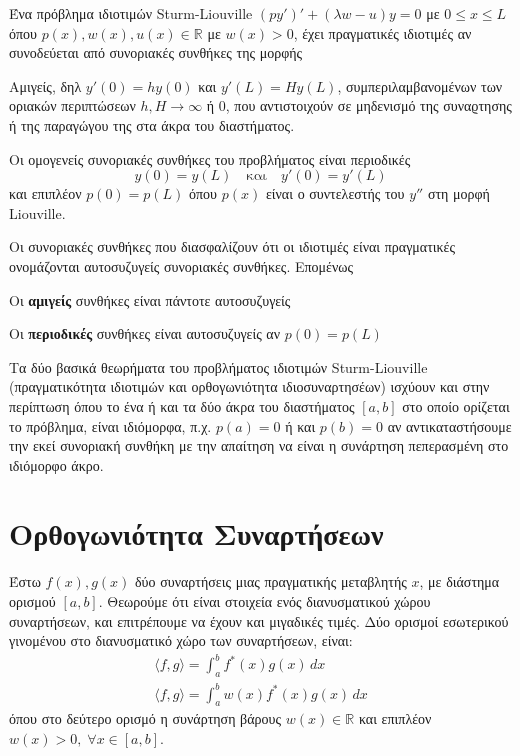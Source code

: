 \begin{thm}
  Ένα πρόβλημα ιδιοτιμών Sturm-Liouville $ (py')' + (\lambda w-u)y=0 $ με $ 0 \leq x \leq
  L$ όπου $ p(x), w(x), u(x) \in \mathbb{R} $ με $w(x)>0$, έχει πραγματικές ιδιοτιμές 
  αν συνοδεύεται από συνοριακές συνθήκες της μορφής 
  \begin{myitemize}
    \item Αμιγείς, δηλ $ y'(0) = h y(0) $ και $ y'(L) = Hy(L) $, συμπεριλαμβανομένων 
      των οριακών περιπτώσεων $ h,H \to \infty $ ή $ 0 $, που αντιστοιχούν σε μηδενισμό 
      της συναϱτησης ή της παραγώγου της στα άκρα του διαστήματος.
    \item Οι ομογενείς συνοριακές συνθήκες του προβλήματος είναι περιοδικές 
      \[
        y(0)=y(L) \quad \text{και} \quad y'(0) = y'(L)
      \] 
      και επιπλέον $ p(0)=p(L) $ όπου $ p(x) $ είναι ο συντελεστής του $ y'' $ 
      στη μορφή Liouville.
  \end{myitemize}
\end{thm}

\begin{rem}
  Οι συνοριακές συνθήκες που διασφαλίζουν ότι οι ιδιοτιμές είναι πραγματικές ονομάζονται 
  αυτοσυζυγείς συνοριακές συνθήκες. Επομένως
  \begin{myitemize}
    \item Οι \textbf{αμιγείς} συνθήκες είναι πάντοτε αυτοσυζυγείς
    \item Οι \textbf{περιοδικές} συνθήκες είναι αυτοσυζυγείς αν $ p(0)=p(L) $
  \end{myitemize}
\end{rem}

\begin{prop}
  Τα δύο βασικά θεωρήματα του προβλήματος ιδιοτιμών Sturm-Liouville (πραγματικότητα
  ιδιοτιμών και ορθογωνιότητα ιδιοσυναρτησέων) ισχύουν και στην περίπτωση όπου το 
  ένα ή και τα δύο άκρα του διαστήματος $ [a,b] $ στο οποίο ορίζεται το πρόβλημα, 
  είναι ιδιόμορφα, π.χ. $ p(a)=0 $ ή και $ p(b)=0 $ αν αντικαταστήσουμε την εκεί 
  συνοριακή συνθήκη με την απαίτηση να είναι η συνάρτηση πεπερασμένη στο ιδιόμορφο άκρο.
\end{prop}

\section*{Ορθογωνιότητα Συναρτήσεων}

Έστω $ f(x), g(x) $ δύο συναρτήσεις μιας πραγματικής μεταβλητής $ x $, με διάστημα 
ορισμού $ [a,b] $. Θεωρούμε ότι είναι στοιχεία ενός διανυσματικού χώρου συναρτήσεων, και 
επιτρέπουμε να έχουν και μιγαδικές τιμές. Δύο ορισμοί εσωτερικού γινομένου στο 
διανυσματικό χώρο των συναρτήσεων, είναι:
\begin{gather}
  \langle f, g\rangle = \int _{a}^{b} f^{*}(x)g(x) \,{dx} \label{eq:inner1} \\
  \langle f, g\rangle = \int _{a}^{b} w(x) f^{*}(x)g(x) \,{dx} \label{eq:inner2} 
\end{gather}
όπου στο δεύτερο ορισμό η συνάρτηση βάρους $ w(x) \in \mathbb{R} $ και επιπλέον 
$ w(x) >0, \; \forall x \in [a,b] $. 

